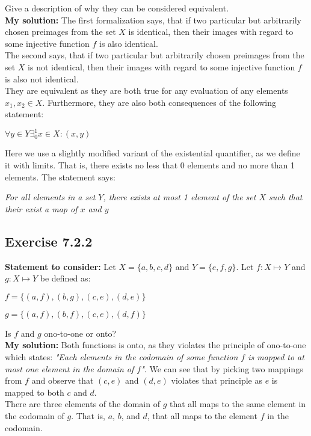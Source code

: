 \documentclass{article}
\newcommand{\cent}[1]{\begin{center}#1\end{center}}
\newcommand{\In}{\! \in \!}
\newcommand{\Remark}{\textbf{Statement to consider: }}
\newcommand{\Solution}{\textbf{My solution: }}
\newcommand{\Exercise}[1]{\subsection*{Exercise #1}}
\begin{document}
 	Give a description of why they can be considered equivalent.\\
 	
 	\Solution
 	The first formalization says, that if two particular but arbitrarily chosen preimages from the set $X$ is identical, then their images with regard to some injective function $f$ is also identical.\\
 	
 	The second says, that if two particular but arbitrarily chosen preimages from the set $X$ is not identical, then their images with regard to some injective function $f$ is also not identical.\\
 	
 	They are equivalent as they are both true for any evaluation of any elements $x_1,x_2 \In X$. Furthermore, they are also both consequences of the following statement:
 	
 	\cent{$\forall y \In Y \exists_0^1 x \In X : (x,y)$} 	
 	 
 	 Here we use a slightly modified variant of the existential quantifier, as we define it with limits. That is, there exists no less that 0 elements and no more than 1 elements. The statement says:
 	 
 	 \begin{center}
 	 	\textit{For all elements in a set $Y$, there exists at most 1 element of the set $X$ such that their exist a map of  $x$  and $y$}
 	 \end{center}
 	
 	\Exercise{7.2.2}
 	
 	\Remark
 	Let $X = \{a,b,c,d\}$ and $Y = \{e,f,g\}$. Let $f : X \mapsto Y$ and $g : X \mapsto Y$ be defined as:
 	
 	\cent{$f = \{(a,f),(b,g),(c,e), (d,e)\}$}
 	\cent{$g = \{(a,f),(b,f),(c,e), (d,f)\}$}
 	
 	Is $f$ and $g$ ono-to-one or onto?\\
 	
 	\Solution
 	Both functions is onto, as they violates the principle of ono-to-one which states: \textit{"Each elements in the codomain of some function $f$ is mapped to at most one element in the domain of $f$"}. We can see that by picking two mappings from $f$ and observe that $(c,e)$ and $(d,e)$ violates that principle as $e$ is mapped to both $c$ and $d$.\\
 	
 	There are three elements of the domain of $g$ that all maps to the same element in the codomain of $g$. That is, $a$, $b$, and $d$, that all maps to the element $f$ in the codomain.
 	
\end{document}

